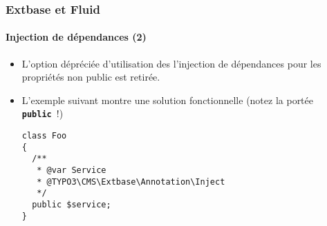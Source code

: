 %

\begin{frame}[fragile]
	\frametitle{Extbase et Fluid}
	\framesubtitle{Injection de dépendances (2)}


	\begin{itemize}
		\item L'option dépréciée d'utilisation des l'injection de dépendances
			pour les propriétés non public est retirée.
		\item L'exemple suivant montre une solution fonctionnelle\newline
			\small(notez la portée \texttt{\textbf{public}}~!)\normalsize
\begin{lstlisting}
class Foo
{
  /**
   * @var Service
   * @TYPO3\CMS\Extbase\Annotation\Inject
   */
  public $service;
}
\end{lstlisting}

	\end{itemize}

\end{frame}

